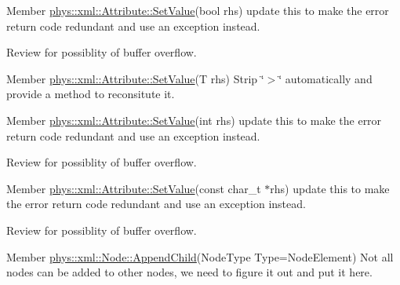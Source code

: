 \label{todo__todo000037}
\hypertarget{todo__todo000037}{}
 
\begin{DoxyDescription}
\item[Member \hyperlink{classphys_1_1xml_1_1Attribute_a6df4cf0f083482e69e4e6e94599a1d82}{phys::xml::Attribute::SetValue}(bool rhs) ]update this to make the error return code redundant and use an exception instead. 

Review for possiblity of buffer overflow. 
\end{DoxyDescription}

\label{todo__todo000038}
\hypertarget{todo__todo000038}{}
 
\begin{DoxyDescription}
\item[Member \hyperlink{classphys_1_1xml_1_1Attribute_af9b12723a227b833d7f8986a524b0e48}{phys::xml::Attribute::SetValue}(T rhs) ]Strip \char`\"{}$>$\char`\"{} automatically and provide a method to reconsitute it. 
\end{DoxyDescription}

\label{todo__todo000034}
\hypertarget{todo__todo000034}{}
 
\begin{DoxyDescription}
\item[Member \hyperlink{classphys_1_1xml_1_1Attribute_a693f7bd8015866c3c4979101c343ce50}{phys::xml::Attribute::SetValue}(int rhs) ]update this to make the error return code redundant and use an exception instead. 

Review for possiblity of buffer overflow. 
\end{DoxyDescription}

\label{todo__todo000033}
\hypertarget{todo__todo000033}{}
 
\begin{DoxyDescription}
\item[Member \hyperlink{classphys_1_1xml_1_1Attribute_a470512fcd8b4f7609319bf85df100aaa}{phys::xml::Attribute::SetValue}(const char\_\-t $\ast$rhs) ]update this to make the error return code redundant and use an exception instead. 

Review for possiblity of buffer overflow. 
\end{DoxyDescription}

\label{todo__todo000040}
\hypertarget{todo__todo000040}{}
 
\begin{DoxyDescription}
\item[Member \hyperlink{classphys_1_1xml_1_1Node_aef276a1af2f747e56072173c18e8382d}{phys::xml::Node::AppendChild}(NodeType Type=NodeElement) ]Not all nodes can be added to other nodes, we need to figure it out and put it here. 
\end{DoxyDescription}


